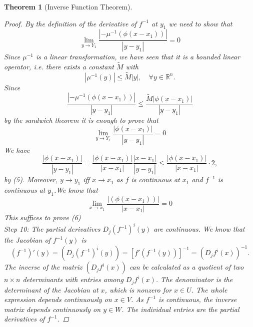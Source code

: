\documentclass[12pt]{article}
\def\RR{\mathbb{R}}
\newtheorem{theorem}{Theorem}[section]
\begin{document}
\begin{theorem}[Inverse Function Theorem]
\begin{proof}
By the definition of the derivative of $f^{-1}$ at $y_1$ we need to show that
\begin{equation}
\lim_{y \rightarrow Y_1}\frac{|-\mu^{-1}(\phi(x-x_1))|}{|y-y_1|}=0
\end{equation}
Since $\mu^{-1}$ is a linear transformation, we have seen that it is a bounded linear operator, i.e.
there exists a constant $\tilde{M}$ with
\[|\mu^{-1}(y)| \leq \tilde{M}|y|, \quad \forall y \in \RR^n . \]
Since
\[ \frac{|-\mu^{-1}(\phi(x-x_1))|}{|y-y_1|} \leq \frac{\tilde{M}|\phi(x-x_1)|}{|y-y_1|} \]
by the sandwich theorem it is enough to prove that
\[\lim_{y \rightarrow Y_1}\frac{|\phi(x-x_1)|}{|y-y_1|} =0\]
We have 
\[\frac{|\phi(x-x_1)|}{|y-y_1|} = \frac{|\phi(x-x_1)|}{|x-x_1|}\frac{|x-x_1|}{|y-y_1|} \leq \frac{|\phi(x-x_1)|}{|x-x_1|}\cdot 2,\]
by (5). Moreover, $y \rightarrow y_1$ iff $ x \rightarrow x_1$ as $ f$ is continuous at $x_1$ and $f^{-1}$ is continuous at $y_1$.We know that
\[\lim_{x \rightarrow x_1} \frac{|(\phi(x-x_1))|}{|x-x_1|} = 0 \]
This suffices to prove (6)\\
\textit{Step 10:} The partial derivatives $D_j (f^{-1})^i(y)$ are continuous. We know that the Jacobian of $f^{-1}(y)$ is
\[(f^{-1})'(y) = (D_j (f^{-1})^i(y)) = [f'(f^{-1}(y))]^{-1} = (D_j f^i (x))^{-1}. \] 
The inverse of the matrix $(D_jf^i(x))$ can be calculated as a quotient of two $n \times n$ determinants with entries among $D_jf^i(x)$. The denominator is the determinant of the Jacobian at $x$, which is nonzero for $x \in U$. The whole expression depends continuously on $x \in V$. As $f^{-1}$ is continuous, the inverse matrix depends continuously on $y \in W$. The individual entries are the partial derivatives of $f^{-1}$.
\end{proof}

\end{theorem}
\end{document}
